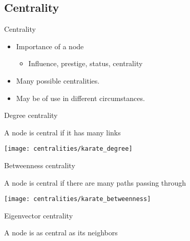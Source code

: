 \documentclass[hide notes,compress]{beamer}
\begin{document}
\subsection{Centrality}
\begin{frame}[c]{Centrality}
  \begin{itemize}
    \item Importance of a node
      \begin{itemize}
        \item Influence, prestige, status, centrality 
      \end{itemize}
    \item Many possible centralities. 
    \item May be of use in different circumstances.
  \end{itemize}
\end{frame}

\begin{frame}[t]{Degree centrality}
  \begin{overlayarea}{\linewidth}{5mm}
  A node is central if it has many links
  \end{overlayarea}
  \begin{overlayarea}{\linewidth}{\textheight}
    \texttt{[image: centralities/karate\_degree]}
  \end{overlayarea}
\end{frame}

\begin{frame}[t]{Betweenness centrality}
  \begin{overlayarea}{\linewidth}{5mm}
  A node is central if there are many paths passing through
  \end{overlayarea}
  \begin{overlayarea}{\linewidth}{\textheight}
    \texttt{[image: centralities/karate\_betweenness]}
  \end{overlayarea}
\end{frame}

\begin{frame}[t]{Eigenvector centrality}
  \begin{overlayarea}{\linewidth}{5mm}
    A node is as central as its neighbors %
  \end{overlayarea}
  \begin{overlayarea}{\linewidth}{\textheight}
  \end{overlayarea}
\end{frame}
\end{document}
